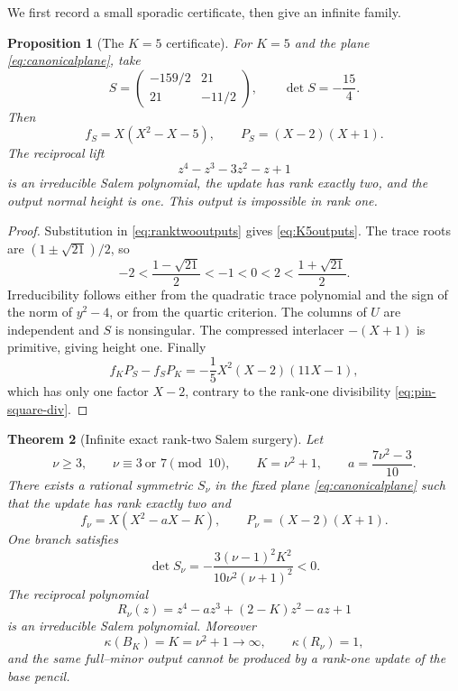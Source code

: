 \documentclass[11pt,reqno]{amsart}
\newtheorem{theorem}{Theorem}[section]
\newtheorem{proposition}[theorem]{Proposition}
\theoremstyle{definition}
\theoremstyle{remark}
\begin{document}
We first record a small sporadic certificate, then give an infinite family.

\begin{proposition}[The $K=5$ certificate]\label{prop:K5}
For $K=5$ and the plane \eqref{eq:canonicalplane}, take
\[
 S=\begin{pmatrix}-159/2&21\\21&-11/2\end{pmatrix},\qquad
 \det S=-\frac{15}{4}.
\]
Then
\begin{equation}\label{eq:K5outputs}
 f_S=X(X^2-X-5),\qquad P_S=(X-2)(X+1).
\end{equation}
The reciprocal lift
\begin{equation}\label{eq:K5salem}
 z^4-z^3-3z^2-z+1
\end{equation}
is an irreducible Salem polynomial, the update has rank exactly two, and the
output normal height is one.  This output is impossible in rank one.
\end{proposition}

\begin{proof}
Substitution in \eqref{eq:ranktwooutputs} gives \eqref{eq:K5outputs}.  The
trace roots are $(1\pm\sqrt{21})/2$, so
\[
 -2<\frac{1-\sqrt{21}}2<-1<0<2<\frac{1+\sqrt{21}}2.
\]
Irreducibility follows either from the quadratic trace polynomial and the
sign of the norm of $y^2-4$, or from the quartic criterion.  The columns of
$U$ are independent and $S$ is nonsingular.  The compressed interlacer
$-(X+1)$ is primitive, giving height one.  Finally
\[
 f_KP_S-f_SP_K=-\frac15X^2(X-2)(11X-1),
\]
which has only one factor $X-2$, contrary to the rank-one divisibility
\eqref{eq:pin-square-div}.
\end{proof}

\begin{theorem}[Infinite exact rank-two Salem surgery]\label{thm:infinite}
Let
\begin{equation}\label{eq:tconditions}
 \nu\geq3,\qquad \nu\equiv3\ \text{or }7\pmod {10},\qquad
 K=\nu^2+1,\qquad a=\frac{7\nu^2-3}{10}.
\end{equation}
There exists a rational symmetric $S_\nu$ in the fixed plane
\eqref{eq:canonicalplane} such that the update has rank exactly two and
\begin{equation}\label{eq:infiniteoutputs}
 f_\nu=X(X^2-aX-K),\qquad P_\nu=(X-2)(X+1).
\end{equation}
One branch satisfies
\begin{equation}\label{eq:detSt}
 \det S_\nu=-\frac{3(\nu-1)^2K^2}{10\nu^2(\nu+1)^2}<0.
\end{equation}
The reciprocal polynomial
\begin{equation}\label{eq:Rt}
 R_\nu(z)=z^4-az^3+(2-K)z^2-az+1
\end{equation}
is an irreducible Salem polynomial.  Moreover
\begin{equation}\label{eq:heightcollapse}
 \kappa(B_K)=K=\nu^2+1\longrightarrow\infty,\qquad
 \kappa(R_\nu)=1,
\end{equation}
and the same full--minor output cannot be produced by a rank-one update of
the base pencil.
\end{theorem}
\end{document}
